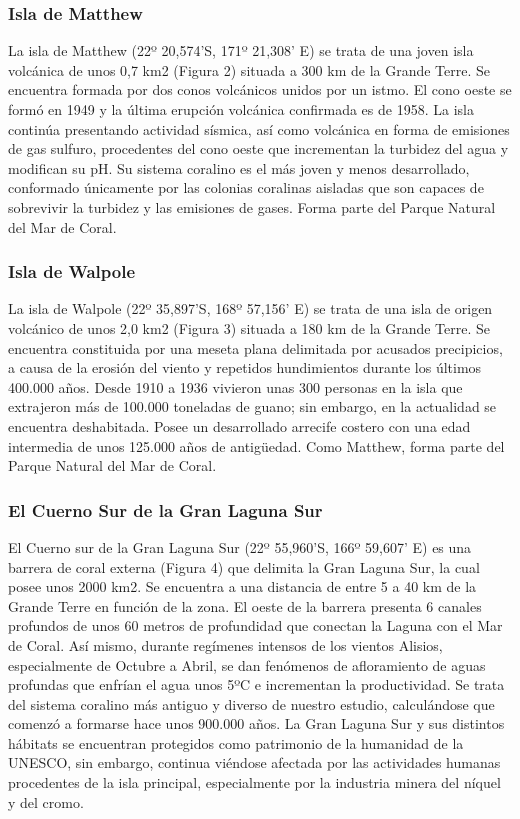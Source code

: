 \documentclass[a4paper, 11pt]{article}
\begin{document}
\subsubsection{Isla de Matthew}
La isla de Matthew (22º 20,574’S, 171º 21,308’ E) se trata de una joven isla volcánica de unos 0,7 km2 (Figura 2) situada a 300 km de la Grande Terre. Se encuentra formada por dos conos volcánicos unidos por un istmo. El cono oeste se formó en 1949 y la última erupción volcánica confirmada es de 1958. La isla continúa presentando actividad sísmica, así como volcánica en forma de emisiones de gas sulfuro, procedentes del cono oeste que incrementan la turbidez del agua y modifican su pH. Su sistema coralino es el más joven y menos desarrollado, conformado únicamente por las colonias coralinas aisladas que son capaces de sobrevivir la turbidez y las emisiones de gases. Forma parte del Parque Natural del Mar de Coral.
\subsubsection{Isla de Walpole}
La isla de Walpole (22º 35,897’S, 168º 57,156’ E) se trata de una isla de origen volcánico de unos 2,0 km2 (Figura 3) situada a 180 km de la Grande Terre. Se encuentra constituida por una meseta plana delimitada por acusados precipicios, a causa de la erosión del viento y repetidos hundimientos durante los últimos 400.000 años. Desde 1910 a 1936 vivieron unas 300 personas en la isla que extrajeron más de 100.000 toneladas de guano; sin embargo, en la actualidad se encuentra deshabitada. Posee un desarrollado arrecife costero con una edad intermedia de unos 125.000 años de antigüedad. Como Matthew, forma parte del Parque Natural del Mar de Coral. 

\subsubsection{El Cuerno Sur de la Gran Laguna Sur}
El Cuerno sur de la Gran Laguna Sur (22º 55,960’S, 166º 59,607’ E) es una barrera de coral externa (Figura 4) que delimita la Gran Laguna Sur, la cual posee unos 2000 km2. Se encuentra a una distancia de entre 5 a 40 km de la Grande Terre en función de la zona. El oeste de la barrera presenta 6 canales profundos de unos 60 metros de profundidad que conectan la Laguna con el Mar de Coral. Así mismo, durante regímenes intensos de los vientos Alisios, especialmente de Octubre a Abril, se dan fenómenos de afloramiento de aguas profundas que enfrían el agua unos 5ºC e incrementan la productividad. Se trata del sistema coralino más antiguo y diverso de nuestro estudio, calculándose que comenzó a formarse hace unos 900.000 años. La Gran Laguna Sur y sus distintos hábitats se encuentran protegidos como patrimonio de la humanidad de la UNESCO, sin embargo, continua viéndose afectada por las actividades humanas procedentes de la isla principal, especialmente por la industria minera del níquel y del cromo. 
\end{document}
